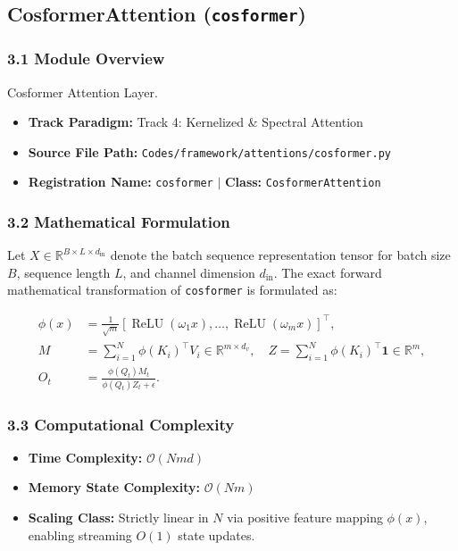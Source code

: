 \subsection{CosformerAttention (\texttt{cosformer})}
\label{sec:app_module_cosformer}

\subsubsection*{3.1 Module Overview}
Cosformer Attention Layer.
\begin{itemize}
    \item \textbf{Track Paradigm:} Track 4: Kernelized \& Spectral Attention
    \item \textbf{Source File Path:} \texttt{Codes/framework/attentions/cosformer.py}
    \item \textbf{Registration Name:} \texttt{cosformer} $\mid$ \textbf{Class:} \texttt{CosformerAttention}
\end{itemize}

\subsubsection*{3.2 Mathematical Formulation}
Let $X \in \mathbb{R}^{B \times L \times d_{\text{in}}}$ denote the batch sequence representation tensor for batch size $B$, sequence length $L$, and channel dimension $d_{\text{in}}$. The exact forward mathematical transformation of \texttt{cosformer} is formulated as:

\begin{align}
\phi(x) &= \frac{1}{\sqrt{m}} \left[ \operatorname{ReLU}(\omega_1 x), \dots, \operatorname{ReLU}(\omega_m x) \right]^\top, \\
M &= \sum_{i=1}^N \phi(K_i)^\top V_i \in \mathbb{R}^{m \times d_v}, \quad Z = \sum_{i=1}^N \phi(K_i)^\top \mathbf{1} \in \mathbb{R}^m, \\
O_t &= \frac{\phi(Q_t) M_t}{\phi(Q_t) Z_t + \epsilon}.
\end{align}


\subsubsection*{3.3 Computational Complexity}
\begin{itemize}
    \item \textbf{Time Complexity:} $\mathcal{O}(N m d)$
    \item \textbf{Memory State Complexity:} $\mathcal{O}(N m)$
    \item \textbf{Scaling Class:} Strictly linear in $N$ via positive feature mapping $\phi(x)$, enabling streaming $O(1)$ state updates.
\end{itemize}

